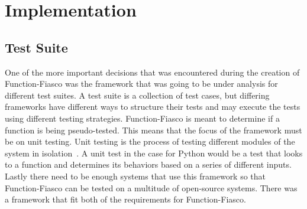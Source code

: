 %
%
%
\chapter{Implementation}\label{ch:implem}

\section{Test Suite}
One of the more important decisions that was encountered during the creation of Function-Fiasco was the framework that was going to be under analysis for different test suites. A test suite is a collection of test cases, but differing frameworks have different ways to structure their tests and may execute the tests using different testing strategies. Function-Fiasco is meant to determine if a function is being pseudo-tested. This means that the focus of the framework must be on unit testing. Unit testing is the process of testing different modules of the system in isolation~\cite{friedman_voas_1995}. A unit test in the case for Python would be a test that looks to a function and determines its behaviors based on a series of different inputs. Lastly there need to be enough systems that use this framework so that Function-Fiasco can be tested on a multitude of open-source systems. There was a framework that fit both of the requirements for Function-Fiasco.

